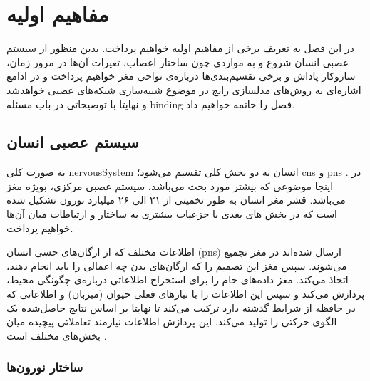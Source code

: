 \documentclass[12pt]{report}
\begin{document}
	
	
	\chapter{مفاهیم اولیه}
	\label{ch:Defs}
	\pagestyle{plain}
	\setcounter{page}{1}
	
	در این فصل به تعریف برخی از مفاهیم اولیه خواهیم پرداخت. بدین منظور از سیستم عصبی انسان شروع و به مواردی چون ساختار اعصاب، تغیرات آن‌ها در مرور زمان، سازوکار پاداش و برخی تقسیم‌بندی‌ها درباره‌ی نواحی مغز خواهیم پرداخت و در ادامع اشاره‌ای به روش‌‌های مدلسازی رایج در موضوع شبیه‌سازی شبکه‌های عصبی خواهدشد و نهایتا با توضیحاتی در باب مسئله \gls{binding} فصل را خاتمه خواهیم داد.
	
	\section{سیستم عصبی انسان}
	
	به صورت کلی \gls{nervousSystem} انسان به دو بخش کلی تقسیم می‌شود؛ \gls{cns}
	و \gls{pns}
	.
	در اینجا موضوعی که بیشتر مورد بحث می‌باشد، سیستم عصبی مرکزی، بویژه مغز می‌باشد. قشر مغز انسان به طور تخمینی از ۲۱ الی ۲۶ میلیارد نورون تشکیل شده است
	\cite{Pelvig2008-vh}
	که در بخش های بعدی با جزعیات بیشتری به ساختار و ارتباطات میان آن‌ها خواهیم پرداخت.
	
	
	اطلاعات مختلف که از ارگان‌های حسی انسان (\gls{pns}) ارسال شده‌اند در مغز تجمیع می‌شوند. سپس مغز این تصمیم را که ارگان‌های بدن چه اعمالی را باید انجام دهند، اتخاذ می‌کند. مغز داده‌های خام را برای استخراج اطلاعاتی درباره‌ی چگونگی محیط، پردازش می‌کند و سپس این اطلاعات را با نیاز‌های فعلی حیوان (میزبان) و اطلاعاتی که در حافظه از شرایط گذشته دارد ترکیب می‌کند تا نهایتا بر اساس نتایج حاصل‌شده یک الگوی حرکتی را تولید می‌کند. این پردازش اطلاعات نیازمند تعاملاتی پیچیده میان بخش‌های مختلف است 
	\cite{carew2000}.
	
	\subsection{ساختار نورون‌ها}
	
\end{document}
